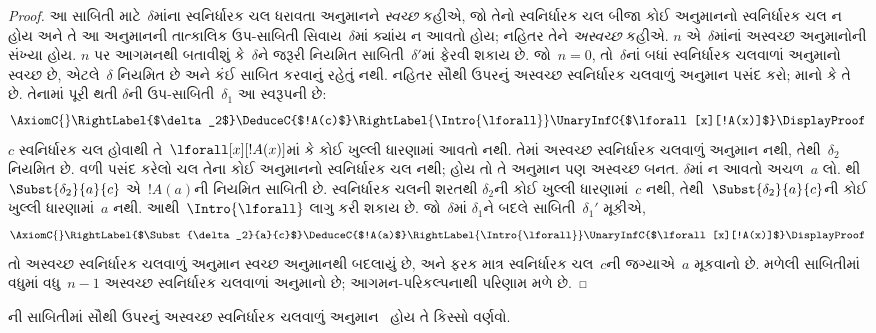 \begin{proof}
આ સાબિતી માટે~$\delta$માંના
સ્વનિર્ધારક ચલ ધરાવતા
અનુમાનને \emph{સ્વચ્છ}
કહીએ, જો તેનો સ્વનિર્ધારક
ચલ બીજા કોઈ અનુમાનનો
સ્વનિર્ધારક ચલ ન હોય
અને તે આ અનુમાનની
તાત્કાલિક ઉપ-સાબિતી
સિવાય~$\delta$માં ક્યાંય
ન આવતો હોય; નહિતર તેને
\emph{અસ્વચ્છ} કહીએ.
$n$ એ~$\delta$માંનાં
અસ્વચ્છ અનુમાનોની સંખ્યા
હોય. $n$ પર આગમનથી
બતાવીશું કે~$\delta$ને
જરૂરી નિયમિત
સાબિતી~$\delta'$માં
ફેરવી શકાય છે.
જો~$n=0$, તો~$\delta$નાં બધાં
સ્વનિર્ધારક ચલવાળાં અનુમાનો
સ્વચ્છ છે, એટલે~$\delta$
નિયમિત છે અને કંઈ સાબિત
કરવાનું રહેતું નથી.
નહિતર સૌથી ઉપરનું
અસ્વચ્છ સ્વનિર્ધારક ચલવાળું
અનુમાન પસંદ કરો;
માનો કે તે~\Intro{\lforall}
છે. તેનામાં પૂરી થતી
$\delta$ની
ઉપ-સાબિતી~$\delta_1$
આ સ્વરૂપની છે:
    \[
    \AxiomC{}
    \RightLabel{$\delta_2$}
    \DeduceC{$!A(c)$}
    \RightLabel{\Intro{\lforall}}
    \UnaryInfC{$\lforall[x][!A(x)]$}
    \DisplayProof
    \]
$c$ સ્વનિર્ધારક ચલ હોવાથી
તે~$\lforall[x][!A(x)]$માં
કે કોઈ ખુલ્લી ધારણામાં
આવતો નથી.
તેમાં અસ્વચ્છ
સ્વનિર્ધારક ચલવાળું અનુમાન
નથી, તેથી~$\delta_2$
નિયમિત છે. વળી પસંદ કરેલો
ચલ તેના કોઈ અનુમાનનો
સ્વનિર્ધારક ચલ નથી;
હોય તો તે અનુમાન પણ
અસ્વચ્છ બનત.
$\delta$માં ન આવતો
અચળ~$a$ લો.
થી
$\Subst{\delta_2}{a}{c}$
એ~$!A(a)$ની નિયમિત
સાબિતી છે.
સ્વનિર્ધારક ચલની શરતથી
$\delta_2$ની કોઈ ખુલ્લી
ધારણામાં~$c$ નથી,
તેથી~$\Subst{\delta_2}{a}{c}$ની
કોઈ ખુલ્લી ધારણામાં~$a$
નથી. આથી~$\Intro{\lforall}$
લાગુ કરી શકાય છે.
જો~$\delta$માં
$\delta_1$ને બદલે
સાબિતી~$\delta_1'$ મૂકીએ,
    \[
    \AxiomC{}
    \RightLabel{$\Subst{\delta_2}{a}{c}$}
    \DeduceC{$!A(a)$}
    \RightLabel{\Intro{\lforall}}
    \UnaryInfC{$\lforall[x][!A(x)]$}
    \DisplayProof
    \]
તો અસ્વચ્છ સ્વનિર્ધારક
ચલવાળું અનુમાન સ્વચ્છ
અનુમાનથી બદલાયું છે,
અને ફરક માત્ર
સ્વનિર્ધારક ચલ~$c$ની
જગ્યાએ~$a$ મૂકવાનો છે.
મળેલી સાબિતીમાં
વધુમાં વધુ~$n-1$
અસ્વચ્છ સ્વનિર્ધારક
ચલવાળાં અનુમાનો છે;
આગમન-પરિકલ્પનાથી
પરિણામ મળે છે.
\end{proof}

\begin{prob}
ની
સાબિતીમાં સૌથી ઉપરનું
અસ્વચ્છ સ્વનિર્ધારક
ચલવાળું અનુમાન~\Elim{\lexists}
હોય તે કિસ્સો વર્ણવો.
\end{prob}

